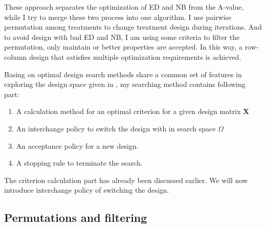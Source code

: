\documentclass[
  a4paper,
  oneside,
  openany,
  12pt,
  onecolumn]{book}
\theoremstyle{plain}
\theoremstyle{definition}
\theoremstyle{remark}
\begin{document}
These approach separates the optimization of ED and NB from the A-value,
while I try to merge these two process into one algorithm. I use
pairwise permutation among treatments to change treatment design during
iterations. And to avoid design with bad ED and NB, I am using some
criteria to filter the permutation, only maintain or better properties
are accepted. In this way, a row-column design that satisfies multiple
optimization requirements is achieved.

\begin{figure}


\caption{\label{fig-align}}

\end{figure}%

Basing on optimal design search methods share a common set of features
in exploring the design space given in \citet{butler2013optimal}, my
searching method contains following part:

\begin{enumerate}
\def\labelenumi{\arabic{enumi}.}
\item
  A calculation method for an optimal criterion for a given design
  matrix \(\boldsymbol{X}\)
\item
  An interchange policy to switch the design with in search space
  \(\Omega\)
\item
  An acceptance policy for a new design.
\item
  A stopping rule to terminate the search.
\end{enumerate}

The criterion calculation part has already been discussed earlier. We
will now introduce interchange policy of switching the design.

\subsection{Permutations and
filtering}\label{permutations-and-filtering}
\end{document}
